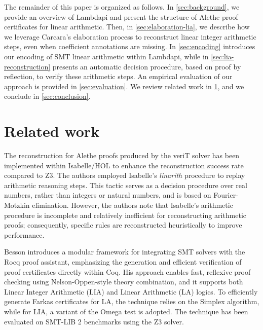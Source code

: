 \documentclass[runningheads]{llncs}
\begin{document}
The remainder of this paper is organized as follows.
In \cref{sec:background}, we provide an overview of Lambdapi and present the structure of Alethe proof certificates for linear arithmetic.
Then, in \cref{sec:elaboration-lia}, we describe how we leverage Carcara's elaboration process to reconstruct linear integer arithmetic steps, even when coefficient annotations are missing.
In \cref{sec:encoding} introduces our encoding of SMT linear arithmetic within Lambdapi, while in \cref{sec:lia-reconstruction} presents an automatic decision procedure, based on proof by reflection, to verify these arithmetic steps.
An empirical evaluation of our approach is provided in \cref{sec:evaluation}. We review related work in \cref{sec:related}, and we conclude in \cref{sec:conclusion}.











\section{Related work}
\label{sec:related}

The reconstruction for Alethe proofs produced by the veriT solver has been implemented within Isabelle/HOL to enhance the reconstruction success rate compared to Z3.
The authors employed Isabelle's \emph{linarith} procedure to replay arithmetic reasoning steps. This tactic serves as a decision procedure over real numbers, rather than integers or natural numbers, and is based on Fourier-Motzkin elimination.
However, the authors note that Isabelle's arithmetic procedure is incomplete and relatively inefficient for reconstructing arithmetic proofs; consequently, specific rules are reconstructed heuristically to improve performance.

Besson \cite{micromega} introduces a modular framework for integrating SMT solvers with the Rocq proof assistant, emphasizing the generation and efficient verification of proof certificates directly within Coq.
His approach enables fast, reflexive proof checking using Nelson-Oppen-style theory combination, and it supports both Linear Integer Arithmetic (LIA) and Linear Arithmetic (LA) logics.
To efficiently generate Farkas certificates for LA, the technique relies on the Simplex algorithm, while for LIA, a variant of the Omega test \cite{omegatest} is adopted.
The technique has been evaluated on SMT-LIB 2 benchmarks using the Z3 solver.
\end{document}

